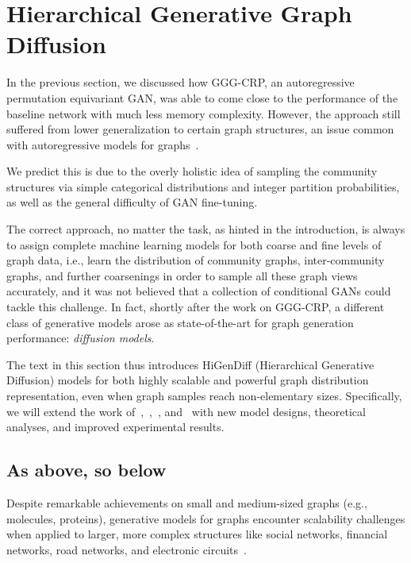 \section{Hierarchical Generative Graph Diffusion}
\label{sec: higendiff}

In the previous section, we discussed how GGG-CRP, an autoregressive permutation equivariant GAN, was able to come close to the performance of the baseline network with much less memory complexity. However, the approach still suffered from lower generalization to certain graph structures, an issue common with autoregressive models for graphs~\cite{krawczuk_gg-gan_2020}. 

We predict this is due to the overly holistic idea of sampling the community structures via simple categorical distributions and integer partition probabilities, as well as the general difficulty of GAN fine-tuning. 

The correct approach, no matter the task, as hinted in the introduction, is always to assign complete machine learning models for both coarse and fine levels of graph data, i.e., learn the distribution of community graphs, inter-community graphs, and further coarsenings in order to sample all these graph views accurately, and it was not believed that a collection of conditional GANs could tackle this challenge. In fact, shortly after the work on GGG-CRP, a different class of generative models arose as state-of-the-art for graph generation performance: \emph{diffusion models}. 

The text in this section thus introduces HiGenDiff (Hierarchical Generative Diffusion) models for both highly scalable and powerful graph distribution representation, even when graph samples reach non-elementary sizes. Specifically, we will extend the work of~\cite{vignac_digress_2022},~\cite{karami_higen_2024},~\cite{karami_multi-resolution_2024}, and~\cite{krawczuk_graph_2024} with new model designs, theoretical analyses, and improved experimental results.

\subsection{As above, so below}
Despite remarkable achievements on small and medium-sized graphs (e.g., molecules, proteins), generative models for graphs encounter scalability challenges when applied to larger, more complex structures like social networks, financial networks, road networks, and electronic circuits~\cite{krawczuk_graph_2024}. 


